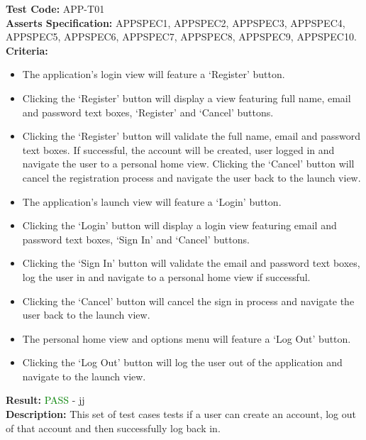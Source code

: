 \documentclass[11pt,a4paper]{report}
\begin{document}
\label{test:APP-T01}
\noindent\textbf{Test Code:} APP-T01\\
\textbf{Asserts Specification:} APPSPEC1, APPSPEC2, APPSPEC3, APPSPEC4, APPSPEC5, APPSPEC6, APPSPEC7, APPSPEC8, APPSPEC9, APPSPEC10.\\ 
\textbf{Criteria:} \begin{itemize}
                     \item  The application's login view will feature a `Register' button.
                     \item Clicking the `Register' button will display a view featuring full name, email and password text boxes, `Register' and `Cancel' buttons.
                     \item Clicking the `Register' button will validate the full name, email and password text boxes. If successful, the account will be created, user logged in and navigate the user to a personal home view.
                   Clicking the `Cancel' button will cancel the registration process and navigate the user back to the launch view.
                   \item The application's launch view will feature a `Login' button.
                   \item Clicking the `Login' button will display a login view featuring email and password text boxes, `Sign In' and `Cancel' buttons.
                   \item Clicking the `Sign In' button will validate the email and password text boxes, log the user in and navigate to a personal home view if successful.
                   \item Clicking the `Cancel' button will cancel the sign in process and navigate the user back to the launch view.
                   \item The personal home view and options menu will feature a `Log Out' button.
                   \item Clicking the `Log Out' button will log the user out of the application and navigate to the launch view.
                   \end{itemize} 
                   
\textbf{Result:} \textcolor{green}{PASS} - jj\\
\textbf{Description:} This set of test cases tests if a user can create an account, log out of that account and then successfully log back in. \\
\end{document}
